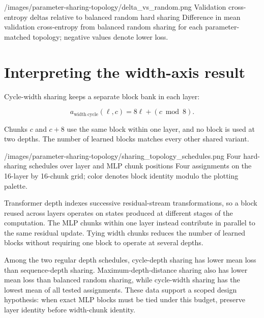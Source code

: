 \documentclass[11pt]{article}
\begin{document}
  {/images/parameter-sharing-topology/delta_vs_random.png}
  {Validation cross-entropy deltas relative to balanced random hard sharing}
  {Difference in mean validation cross-entropy from balanced random sharing for each parameter-matched topology; negative values denote lower loss.}

\section{Interpreting the width-axis result}\label{why-width-sharing-wins}

Cycle-width sharing keeps a separate block bank in each layer:

\[
a_{\mathrm{width\ cycle}}(\ell,c)=8\ell+(c\bmod 8).
\]

Chunks \(c\) and \(c+8\) use the same block within one layer, and no block is used at two depths. The number of learned blocks matches every other shared variant.

  {/images/parameter-sharing-topology/sharing_topology_schedules.png}
  {Four hard-sharing schedules over layer and MLP chunk positions}
  {Four assignments on the 16-layer by 16-chunk grid; color denotes block identity modulo the plotting palette.}

Transformer depth indexes successive residual-stream transformations, so a block reused across layers operates on states produced at different stages of the computation. The MLP chunks within one layer instead contribute in parallel to the same residual update. Tying width chunks reduces the number of learned blocks without requiring one block to operate at several depths.

Among the two regular depth schedules, cycle-depth sharing has lower mean loss than sequence-depth sharing. Maximum-depth-distance sharing also has lower mean loss than balanced random sharing, while cycle-width sharing has the lowest mean of all tested assignments. These data support a scoped design hypothesis: when exact MLP blocks must be tied under this budget, preserve layer identity before width-chunk identity.
\end{document}
